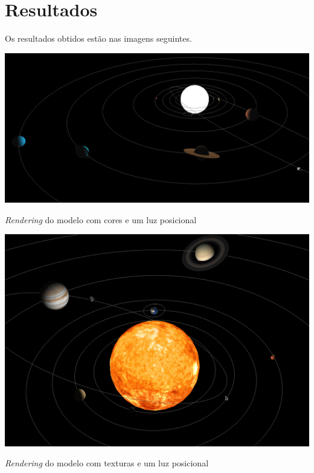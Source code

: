 \section{Resultados}



Os resultados obtidos estão nas imagens seguintes.

\begin{center}
 	
 	\includegraphics[width=\textwidth,height=\textheight,keepaspectratio]{resources/sistemaRGBA.png}
 	\captionsetup{type=figure, width=0.8\linewidth}
	\caption{\textit{Rendering} do modelo com cores e um luz posicional}
\label{fig:ssec3:tilt} 
\end{center}


\begin{center}
 	
 	\includegraphics[width=\textwidth,height=\textheight,keepaspectratio]{resources/sistemaSolar.png}
 	\captionsetup{type=figure, width=0.8\linewidth}
	\caption{\textit{Rendering} do modelo com texturas e um luz posicional}
\label{fig:ssec3:tilt} 
\end{center}


